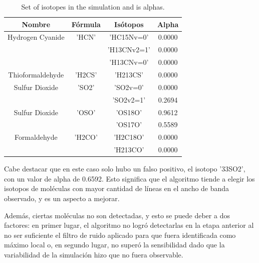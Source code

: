 \documentclass[twocolumn, draft]{emulateapj}
\begin{document}
\begin {table}[H]
\begin{center}
	\begin{tabular}{|c|c|c|c|}
		\hline Nombre & Fórmula &  Isótopos & Alpha \\ 
		
		
		\hline	Hydrogen Cyanide & 'HCN'  & 'HC15Nv=0' & 0.0000\\
		&		  & 'H13CNv2=1' & 0.0000\\
		&		  & 'H13CNv=0' & 0.0000\\ 
		
		
		\hline	Thioformaldehyde & 'H2CS' & 'H213CS' & 0.0000\\
		
		\hline	Sulfur Dioxide & 'SO2'	  & 'SO2v=0' & 0.0000\\
		&		  & 'SO2v2=1'& 0.2694 \\
		
		\hline	Sulfur Dioxide & 'OSO' & 'OS18O' & 0.9612\\
		&	   & 'OS17O' & 0.5589\\
		
		\hline	Formaldehyde & 'H2CO'  & 'H2C18O' & 0.0000\\
		&		   & 'H213CO' & 0.0000\\
		
		\hline 
	\end{tabular}
	\caption {Set of isotopes in the simulation and is alphas.}
\end{center}
\end{table}

Cabe destacar que en este caso solo hubo un falso positivo, el isotopo '33SO2', con un valor de alpha de 0.6592. Esto significa que el algoritmo tiende a elegir los isotopos de moléculas con mayor cantidad de líneas en el ancho de banda observado, y es un aspecto a mejorar. 

Además, ciertas moléculas no son detectadas, y esto se puede deber a dos factores: en primer lugar, el algoritmo no logró detectarlas en la etapa anterior al no ser suficiente el filtro de ruido aplicado para que fuera identificada como máximo local o, en segundo lugar, no superó la sensibilidad dado que la variabilidad de la simulación hizo que no fuera observable. 

\end{document}
